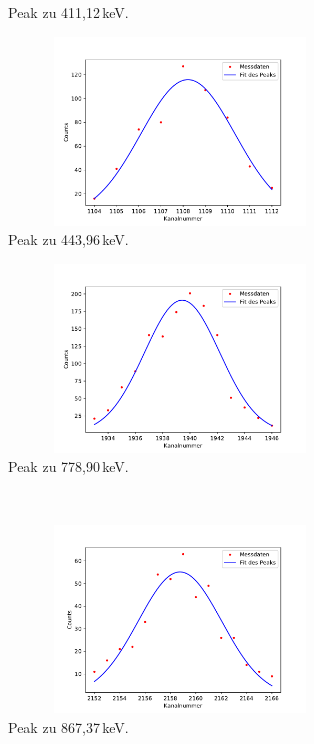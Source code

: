 \begin{figure}
\begin{subfigure}{0.33\textwidth}
        \caption{Peak zu 411,12\,keV.}
      \end{subfigure}
      \begin{subfigure}{0.31\textwidth}
        \centering
        \includegraphics[height=5cm, width=1\textwidth]{germania/peak5/peak5.pdf}
        \caption{Peak zu 443,96\,keV.}
      \end{subfigure}
      \begin{subfigure}{0.31\textwidth}
        \centering
        \includegraphics[height=5cm, width=1\textwidth]{germania/peak6/peak6.pdf}
        \caption{Peak zu 778,90\,keV.}
      \end{subfigure}\\
      \begin{subfigure}{0.31\textwidth}
        \centering
        \includegraphics[height=5cm, width=1\textwidth]{germania/peak7/peak7.pdf}
        \caption{Peak zu 867,37\,keV.}
      \end{subfigure}
      \begin{subfigure}{0.31\textwidth}
        \centering

\end{subfigure}
\end{figure}
